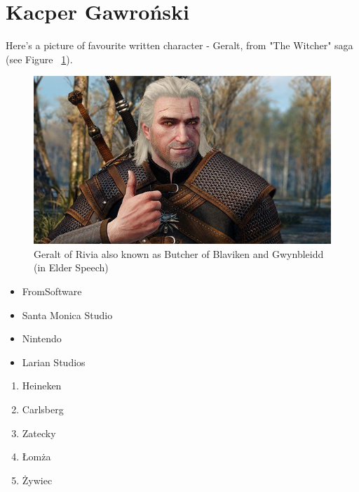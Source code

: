 \newpage

\section{Kacper Gawroński}


Here's a picture of favourite written character - Geralt, from "The Witcher" saga (see Figure ~\ref{fig:geralt}).

\begin{figure}[htbp]
    
    \centering
    \includegraphics[scale = 0.5]{pictures/geralt.jpg}
    \caption{Geralt of Rivia also known as Butcher of Blaviken and Gwynbleidd (in Elder Speech)}
    \label{fig:geralt}
\end{figure}



\newpage


\begin{itemize}
    \item FromSoftware
    \item Santa Monica Studio
    \item Nintendo
    \item Larian Studios
\end{itemize}

    
 \begin{enumerate}
    \item Heineken
    \item Carlsberg
    \item Zatecky
    \item Łomża
    \item Żywiec
     
 \end{enumerate}

